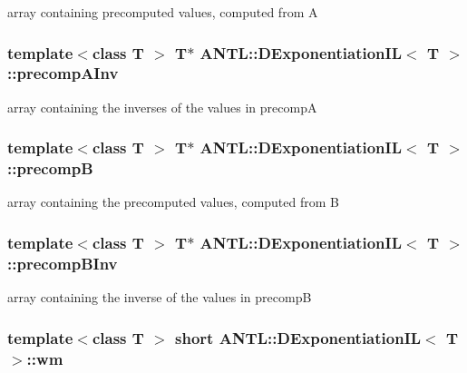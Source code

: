 array containing precomputed values, computed from A \hypertarget{classANTL_1_1DExponentiationIL_ab625cc0aeda76cadee38cfeaa853c4bc}{
\subsubsection[{precomp\-A\-Inv}]{\setlength{\rightskip}{0pt plus 5cm}template$<$class T $>$ T$\ast$ {\bf A\-N\-T\-L\-::\-D\-Exponentiation\-I\-L}$<$ T $>$\-::precomp\-A\-Inv\hspace{0.3cm}{\ttfamily [protected]}}}\label{classANTL_1_1DExponentiationIL_ab625cc0aeda76cadee38cfeaa853c4bc}
array containing the inverses of the values in precomp\-A \hypertarget{classANTL_1_1DExponentiationIL_af58aee3d8912d02a730f54c208f36602}{
\subsubsection[{precomp\-B}]{\setlength{\rightskip}{0pt plus 5cm}template$<$class T $>$ T$\ast$ {\bf A\-N\-T\-L\-::\-D\-Exponentiation\-I\-L}$<$ T $>$\-::precomp\-B\hspace{0.3cm}{\ttfamily [protected]}}}\label{classANTL_1_1DExponentiationIL_af58aee3d8912d02a730f54c208f36602}
array containing the precomputed values, computed from B \hypertarget{classANTL_1_1DExponentiationIL_ab1f51eb99a5f501042ab1ee779e9e9f3}{
\subsubsection[{precomp\-B\-Inv}]{\setlength{\rightskip}{0pt plus 5cm}template$<$class T $>$ T$\ast$ {\bf A\-N\-T\-L\-::\-D\-Exponentiation\-I\-L}$<$ T $>$\-::precomp\-B\-Inv\hspace{0.3cm}{\ttfamily [protected]}}}\label{classANTL_1_1DExponentiationIL_ab1f51eb99a5f501042ab1ee779e9e9f3}
array containing the inverse of the values in precomp\-B \hypertarget{classANTL_1_1DExponentiationIL_ab658a1ad3e54814f114b4ebd2c7b63a1}{
\subsubsection[{wm}]{\setlength{\rightskip}{0pt plus 5cm}template$<$class T $>$ short {\bf A\-N\-T\-L\-::\-D\-Exponentiation\-I\-L}$<$ T $>$\-::wm\hspace{0.3cm}{\ttfamily [protected]}}}\label{classANTL_1_1DExponentiationIL_ab658a1ad3e54814f114b4ebd2c7b63a1}
